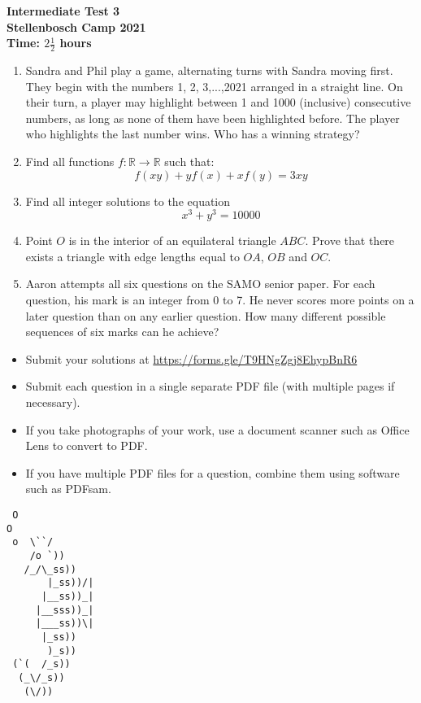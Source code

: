 \documentclass{article}
\begin{document}
\thispagestyle{empty}

\begin{center}
  \textbf{\Large Intermediate Test 3}
  \\ \vspace{1em}
  \textbf{\large Stellenbosch Camp 2021}
  \\ \vspace{1em}
  \textbf{\large Time: $2\frac{1}{2}$ hours}
\end{center}

\bigskip

\begin{enumerate}[itemsep=\fill]

\item %
Sandra and Phil play a game, alternating turns with Sandra moving first. They begin with the numbers 1, 2, 3,...,2021 arranged in a straight line. On their turn, a player may highlight between 1 and 1000 (inclusive) consecutive numbers, as long as none of them have been highlighted before. The player who highlights the last number wins. Who has a winning strategy?

\item %
Find all functions $f: \mathbb{R} \rightarrow \mathbb{R}$ such that:
$$f(xy) + yf(x) + xf(y) = 3xy$$

\item %
Find all integer solutions to the equation $$ x^3+y^3=10 000$$

\item %
Point $O$ is in the interior of an equilateral triangle $ABC$. Prove that there exists a triangle with edge lengths equal to $OA$, $OB$ and $OC$.

\item %
Aaron attempts all six questions on the SAMO senior paper. For each question, his mark is an integer from 0 to 7. He never scores more points on a later question than on any earlier question. How many different possible sequences of six marks can he achieve? 
\end{enumerate}


\vfill
\begin{itemize}
	\item Submit your solutions at \href{https://forms.gle/T9HNgZgj8EhypBnR6}{https://forms.gle/T9HNgZgj8EhypBnR6}
	\item Submit each question in a single separate PDF file (with multiple pages if necessary).
	\item If you take photographs of your work, use a document scanner such as Office Lens to convert to PDF.
	\item If you have multiple PDF files for a question, combine them using software such as PDFsam.
\end{itemize}

\vfill
\centering
\begin{BVerbatim}
 O
O
 o  \``/
    /o `))
   /_/\_ss))
       |_ss))/|
      |__ss))_|
     |__sss))_|
     |___ss))\|
      |_ss))
       )_s))
 (`(  /_s))
  (_\/_s))
   (\/))
\end{BVerbatim}
\end{document}
